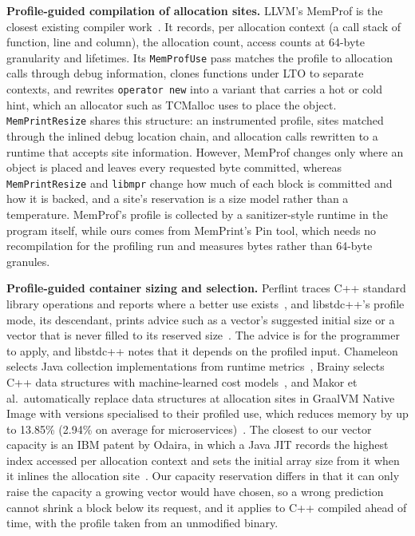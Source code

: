 \documentclass[11pt]{article}
\newcommand{\memprint}{MemPrint}
\newcommand{\libmpr}{\texttt{libmpr}}
\newcommand{\pass}{\texttt{MemPrintResize}}
\begin{document}
\textbf{Profile-guided compilation of allocation sites.} LLVM's MemProf is the closest existing compiler
work~\cite{MemProf}. It records, per allocation context (a call stack of function, line and column), the
allocation count, access counts at 64-byte granularity and lifetimes. Its \texttt{MemProfUse} pass matches the
profile to allocation calls through debug information, clones functions under LTO to separate contexts, and
rewrites \texttt{operator new} into a variant that carries a hot or cold hint, which an allocator such as TCMalloc
uses to place the object. \pass{} shares this structure: an instrumented profile, sites matched through the
inlined debug location chain, and allocation calls rewritten to a runtime that accepts site information.
However, MemProf changes only where an object is placed and leaves every requested byte committed, whereas
\pass{} and \libmpr{} change how much of each block is committed and how it is backed, and a site's reservation is a
size model rather than a temperature. MemProf's profile is collected by a sanitizer-style runtime in the
program itself, while ours comes from \memprint{}'s Pin tool, which needs no recompilation for the profiling run
and measures bytes rather than 64-byte granules.

\textbf{Profile-guided container sizing and selection.} Perflint traces C++ standard library operations and
reports where a better use exists~\cite{Liu2009Perflint}, and libstdc++'s profile mode, its descendant, prints
advice such as a vector's suggested initial size or a vector that is never filled to its reserved
size~\cite{LibstdcxxProfile}. The advice is for the programmer to apply, and libstdc++ notes that it depends on the
profiled input. Chameleon selects Java collection implementations from runtime metrics~\cite{Shacham2009Chameleon},
Brainy selects C++ data structures with machine-learned cost models~\cite{Jung2011Brainy}, and Makor et al.\
automatically replace data structures at allocation sites in GraalVM Native Image with versions specialised to
their profiled use, which reduces memory by up to 13.85\% (2.94\% on average for microservices)~\cite{Makor2025Replacement}.
The closest to our vector capacity is an IBM patent by Odaira, in which a Java JIT records the highest index
accessed per allocation context and sets the initial array size from it when it inlines the allocation
site~\cite{Odaira2015ArraySize}. Our capacity reservation differs in that it can only raise the capacity a growing
vector would have chosen, so a wrong prediction cannot shrink a block below its request, and it applies to C++
compiled ahead of time, with the profile taken from an unmodified binary.
\end{document}
